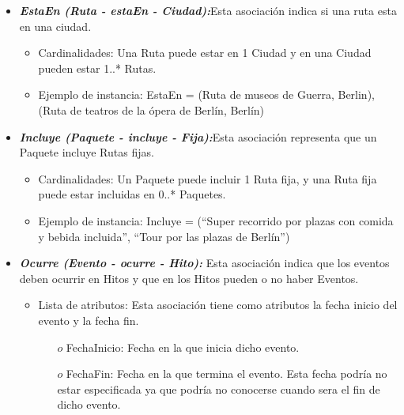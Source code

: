 \documentclass[a4paper]{article}
\begin{document}
\begin{itemize}
{}


\item{

	\textbf{\textit{EstaEn (Ruta - estaEn - Ciudad):}}Esta asociación indica si una ruta esta en una ciudad.
  		
        
        
 \begin{itemize}
        
  \item Cardinalidades: Una Ruta puede estar en 1 Ciudad y en una Ciudad pueden estar 1..*
Rutas.
\item  Ejemplo de instancia: EstaEn = {(Ruta de museos de Guerra, Berlin), (Ruta de teatros de la ópera de Berlín, Berlín)}
   \end{itemize}


}




\item{

	\textbf{\textit{Incluye (Paquete - incluye - Fija):}}Esta asociación representa que un Paquete incluye Rutas fijas.
  		
        
        
 \begin{itemize}
        
  \item Cardinalidades: Un Paquete puede incluir 1 Ruta fija, y una Ruta fija puede estar incluidas en 0..* Paquetes.
\item Ejemplo de instancia: Incluye = {(“Super recorrido por plazas con comida y bebida incluida”, “Tour por las plazas de Berlín”)}
   \end{itemize}


}




\item{

	\textbf{\textit{Ocurre (Evento - ocurre - Hito): }}Esta asociación indica que los eventos deben ocurrir en Hitos y que en los Hitos pueden o no haber Eventos.
  		
        
        
 \begin{itemize}
        
  \item Lista de atributos: Esta asociación tiene como atributos la fecha inicio del evento y la fecha fin.
  
  \begin{itemize}
\item[$o$] FechaInicio: Fecha en la que inicia dicho evento.
\item[$o$] FechaFin: Fecha en la que termina el evento. Esta fecha podría no estar especificada ya que podría no conocerse cuando sera el fin de dicho evento.


\end{itemize}
\end{itemize}}
\end{itemize}
\end{document}
